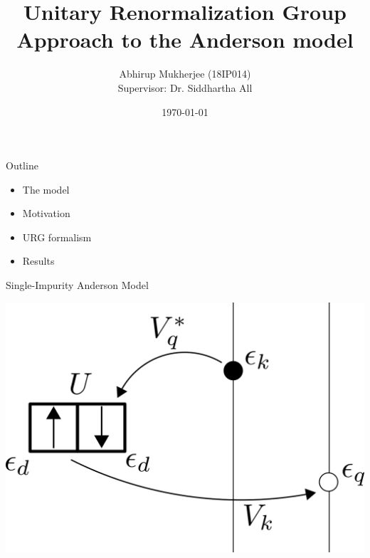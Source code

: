 \documentclass{beamer}
\title{Unitary Renormalization Group Approach to the Anderson model}
\subtitle{}
\date{\today}
\author[author1]{Abhirup Mukherjee (18IP014)\\[5mm]
{Supervisor: Dr. Siddhartha All}
}
\institute{Department of Physical Sciences, IISER Kolkata}
\begin{document}
\maketitle

\begin{frame}{Outline}

\begin{itemize}
  \item The model
  \item Motivation
  \item URG formalism
  \item Results 
\end{itemize}

\end{frame}




\begin{frame}{Single-Impurity Anderson Model}

\vspace*{20pt}
\begin{figure}
\centering
\def\svgwidth{\columnwidth}
\hspace*{-20pt}
\end{figure}
\vspace*{-40pt}
\centering\includegraphics[scale=0.4]{model_scheme.png}

\end{frame}
\end{document}
